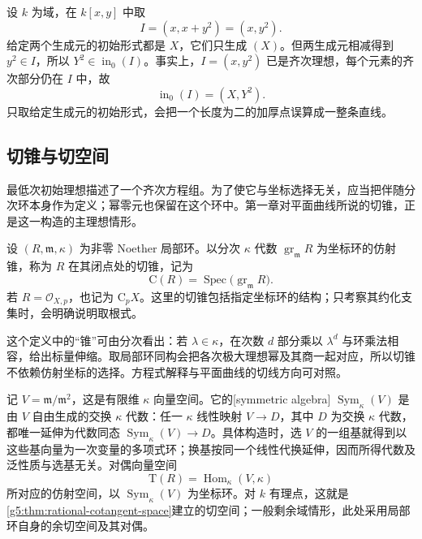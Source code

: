 \begin{example}
\label{g5:exm:initial-generators-fail}
	设 \(k\) 为域，在 \(k[x,y]\) 中取
	\[
		I=(x,x+y^2)=(x,y^2).
	\]
	给定两个生成元的初始形式都是 \(X\)，它们只生成 \((X)\)。但两生成元相减得到 \(y^2\in I\)，所以 \(Y^2\in\operatorname{in}_0(I)\)。事实上，\(I=(x,y^2)\) 已是齐次理想，每个元素的齐次部分仍在 \(I\) 中，故
	\[
		\operatorname{in}_0(I)=(X,Y^2).
	\]
	只取给定生成元的初始形式，会把一个长度为二的加厚点误算成一整条直线。
\end{example}

\subsection{切锥与切空间}
\label{g5:subsec:0504:02}

最低次初始理想描述了一个齐次方程组。为了使它与坐标选择无关，应当把伴随分次环本身作为定义；幂零元也保留在这个环中。第一章对平面曲线所说的切锥，正是这一构造的主理想情形。

\begin{definition}
\label{g5:def:tangent-cone}
	设 \((R,\mathfrak m,\kappa)\) 为非零 Noether 局部环。以分次 \(\kappa\) 代数 \(\operatorname{gr}_{\mathfrak m}R\) 为坐标环的仿射锥，称为 \(R\) 在其闭点处的切锥，记为
	\[
		\mathrm C(R)=\operatorname{Spec}\bigl(\operatorname{gr}_{\mathfrak m}R\bigr).
	\]
	若 \(R=\mathcal O_{X,p}\)，也记为 \(\mathrm C_pX\)。这里的切锥包括指定坐标环的结构；只考察其约化支集时，会明确说明取根式。
\end{definition}

这个定义中的“锥”可由分次看出：若 \(\lambda\in\kappa\)，在次数 \(d\) 部分乘以 \(\lambda^d\) 与环乘法相容，给出标量伸缩。取局部环同构会把各次极大理想幂及其商一起对应，所以切锥不依赖仿射坐标的选择。方程式解释与平面曲线的切线方向可对照\cite[第2章，第1.5节，第94--95页]{Shafarevich2013Basic1}。

\ProseParagraphBreak

记 \(V=\mathfrak m/\mathfrak m^2\)，这是有限维 \(\kappa\) 向量空间。它的[symmetric algebra] \(\operatorname{Sym}_\kappa(V)\) 是由 \(V\) 自由生成的交换 \(\kappa\) 代数：任一 \(\kappa\) 线性映射 \(V\to D\)，其中 \(D\) 为交换 \(\kappa\) 代数，都唯一延伸为代数同态 \(\operatorname{Sym}_\kappa(V)\to D\)。具体构造时，选 \(V\) 的一组基就得到以这些基向量为一次变量的多项式环；换基按同一个线性代换延伸，因而所得代数及泛性质与选基无关。对偶向量空间
\[
	\mathrm T(R)=\operatorname{Hom}_\kappa(V,\kappa)
\]
所对应的仿射空间，以 \(\operatorname{Sym}_\kappa(V)\) 为坐标环。对 \(k\) 有理点，这就是\cref{g5:thm:rational-cotangent-space}建立的切空间；一般剩余域情形，此处采用局部环自身的余切空间及其对偶。

